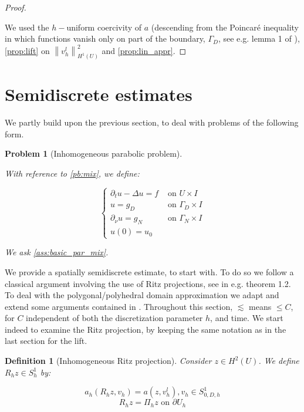 \documentclass[english,a4paper,10pt,oneside]{scrbook}	%
\theoremstyle{break}
\newtheorem{defn}[equation]{Definition}
\newtheorem{pb}[equation]{Problem}
\newenvironment{mproof}[1][\proofname]{%
  \begin{proof}[#1]$ $\par\nobreak\ignorespaces
}{%
  \end{proof}
}
\renewcommand*{\proofname}{Proof}
\theoremstyle{remark}
\newcommand{\norm}[1]{\left\lVert#1\right\rVert}
\begin{document}
\begin{appendices}
\begin{mproof}
We used the $h-$uniform coercivity of $a$ (descending from the Poincaré inequality in which functions vanish only on part of the boundary, $\Gamma_D$, see e.g. lemma 1 of \cite{dorfler}), \cref{prop:lift} on $\norm{v_h^l}_{H^1(U)}^2$ and \cref{prop:lin_appr}.
\end{mproof}

\section{Semidiscrete estimates}
\label{sec:semid}
We partly build upon the previous section, to deal with problems of the following form.

\begin{pb}[Inhomogeneous parabolic problem]
\label{pb:inh_parabolic}

With reference to \cref{pb:mix}, we define:

$$
\left\{\begin{matrix}
\partial_t u-\Delta u = f & \text{ on } U \times I \\ 
u = g_D & \text{ on } \Gamma_D \times I\\ 
\partial_\nu u = g_N & \text{ on } \Gamma_N \times I \\
u(0) =  u_0
\end{matrix}\right.
$$

We ask \cref{ass:basic_par_mix}.

\end{pb}

We provide a spatially semidiscrete estimate, to start with. To do so we follow a classical argument involving the use of Ritz projections, see \cite{thomee} in e.g. theorem 1.2. To deal with the polygonal/polyhedral domain approximation we adapt and extend some arguments contained in \cite{ranner}.
Throughout this section, $\lesssim$ means $\leq C $, for $C$ independent of both the discretization parameter $h$, and time.
We start indeed to examine the Ritz projection, by keeping the same notation as in the last section for the lift.


\begin{defn}[Inhomogeneous Ritz projection]
Consider $z \in H^2(U)$. We define $R_h z \in S^1_h$ by:

$$a_h(R_h z , v_h) = a(z, v_h^l), v_h \in S^1_{0,D,h}$$
$$R_h z = \Pi_h z \text{ on } \partial U_h$$


\end{defn}
\end{appendices}
\end{document}
